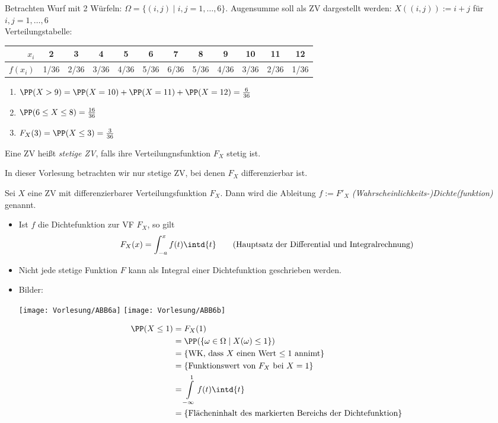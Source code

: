 \documentclass{scrreprt}
\renewenvironment{anumerate}{\begin{enumerate}[label=(\alph*)]}{\end{enumerate}} %
\begin{document}
 Betrachten Wurf mit 2 Würfeln: $\Omega=\{(i,j)\;|\; i,j=1,\dots,6\}$. Augensumme soll als ZV dargestellt werden: $X((i,j)):=i+j$ für $i,j=1,\dots,6$\\
Verteilungstabelle:\\
\begin{tabular}{r | c | c| c| c| c| c| c| c| c| c| c}
$x_i$ & 2 & 3 & 4 & 5 & 6 & 7 & 8 & 9  & 10 & 11 & 12\\
\hline
$f(x_i)$ & 1/36 & 2/36 & 3/36 & 4/36 & 5/36 & 6/36 & 5/36 & 4/36 & 3/36 & 2/36 & 1/36
\end{tabular}
\begin{anumerate}
\item $\PP(X>9) = \PP(X=10) + \PP(X=11) + \PP(X=12) = \frac{6}{36}$
\item $\PP(6\leq X \leq 8) = \frac{16}{36}$
\item $F_X(3) = \PP(X\leq 3) = \frac{3}{36}$
\end{anumerate}

 Eine ZV heißt \emph{stetige ZV}, falls ihre Verteilungnsfunktion $F_X$ stetig ist.

In dieser Vorlesung betrachten wir nur stetige ZV, bei denen $F_X$ differenzierbar ist.

 Sei $X$ eine ZV mit differenzierbarer Verteilungsfunktion $F_X$. Dann wird die Ableitung $f:= F'_X$ \emph{(Wahrscheinlichkeits-)Dichte(funktion)} genannt.

\begin{itemize}
\item Ist $f$ die Dichtefunktion zur VF $F_X$, so gilt
$$F_X(x) = \int_{-a}^x f(t) \intd{t} \qquad \text{(Hauptsatz der Differential und Integralrechnung)}$$
\item Nicht jede stetige Funktion $F$ kann als Integral einer Dichtefunktion geschrieben werden.
\item Bilder:
\begin{center}
\texttt{[image: Vorlesung/ABB6a]}
\texttt{[image: Vorlesung/ABB6b]}
\end{center}
\begin{align*}
\PP(X\leq 1)&=F_X(1)\\
&=\PP(\{\omega \in \Omega \;|\; X(\omega)\leq 1 \}) \\
&= \{\text{WK, dass $X$ einen Wert $\leq 1$ annimt}\}\\
&=\{\text{Funktionswert von $F_X$ bei $X=1$}\}\\
&=\int\limits_{-\infty}^1 f(t)\intd{t}\\
&=\{\text{Flächeninhalt des markierten Bereichs der Dichtefunktion}\}
\end{align*}
\end{itemize}
\end{document}

